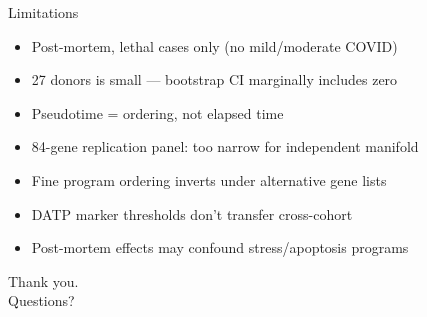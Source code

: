 \documentclass[aspectratio=169]{beamer}
\begin{document}
\begin{frame}{Limitations}
\begin{itemize}
  \item Post-mortem, lethal cases only (no mild/moderate COVID)
  \item 27 donors is small --- bootstrap CI marginally includes zero
  \item Pseudotime = ordering, not elapsed time
  \item 84-gene replication panel: too narrow for independent manifold
  \item Fine program ordering inverts under alternative gene lists
  \item DATP marker thresholds don't transfer cross-cohort
  \item Post-mortem effects may confound stress/apoptosis programs
\end{itemize}
\end{frame}

\begin{frame}[standout]
Thank you. \\ Questions?
\end{frame}
\end{document}
